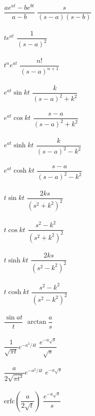 \begin{multicols}{2}
\begin{center}
\begin{tabbing}
			$\dfrac{ae^{at}-be^{bt}}{a-b}$	\> $\dfrac{s}{(s-a)(s-b)}$ \>\LTNUM\\ \\ 
			$te^{at}$	\> $\dfrac{1}{(s-a)^2}$	\>\LTNUM \\ \\
			$t^ne^{at}$	\> $\dfrac{n!}{(s-a)^{n+1}}$	\>\LTNUM \\ \\
			$e^{at}\sin kt$	\> $\dfrac{k}{(s-a)^2+k^2}$  \>\LTNUM \\ \\
			$e^{at}\cos kt$	\> $\dfrac{s-a}{(s-a)^2+k^2}$  \>\LTNUM \\ \\
			$e^{at}\sinh kt$	\> $\dfrac{k}{(s-a)^2-k^2}$  \>\LTNUM \\ \\
			$e^{at}\cosh kt$	\> $\dfrac{s-a}{(s-a)^2-k^2}$  \>\LTNUM \\ \\
			$t\sin kt$  	\> $\dfrac{2ks}{(s^2+k^2)^2}$ \>\LTNUM \\ \\
			$t\cos kt$  	\> $\dfrac{s^2-k^2}{(s^2+k^2)^2}$ \>\LTNUM \\ \\
			$t\sinh kt$  	\> $\dfrac{2ks}{(s^2-k^2)^2}$ \>\LTNUM \\ \\
			$t\cosh kt$  	\> $\dfrac{s^2-k^2}{(s^2-k^2)^2}$ \>\LTNUM \\ \\
			$\dfrac{\sin at}{t}$	\> $\arctan \dfrac{a}{s}$ \>\LTNUM \\ \\
			$\dfrac{1}{\sqrt{\pi t}}e^{-a^2/4t}$	\> $\dfrac{e^{-a\sqrt{s}}}{\sqrt{s}}$ \> \LTNUM \\ \\
			$\dfrac{a}{2\sqrt{\pi t^3}}e^{-a^2/4t}$	\> $e^{-a\sqrt{s}}$ \> \LTNUM \\ \\
			$\text{erfc}\left(\dfrac{a}{2\sqrt{t}}\right)$ \>  $\dfrac{e^{-a\sqrt{s}}}{s}$ \> \LTNUM \\ \\
		\end{tabbing}
	\end{center}
\end{multicols}

\renewcommand{\arraystretch}{1}

\vspace{2ex}

\restoregeometry